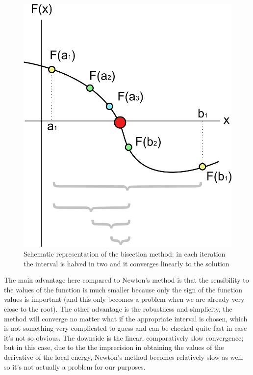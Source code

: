 		\begin{figure}
			\centering \includegraphics[width=0.45\linewidth]{../figures/Bisection_method}
			\protect\caption{Schematic representation of the bisection method: in each iteration the interval is halved in two and it converges linearly to the solution}
		\end{figure}

		The main advantage here compared to Newton's method is that the sensibility to the values of the function is much smaller because only the sign of the function values is important (and this only becomes a problem when we are already very close to the root). The other advantage is the robustness and simplicity, the method will converge no matter what if the appropriate interval is chosen, which is not something very complicated to guess and can be checked quite fast in case it's not so obvious. The downside is the linear, comparatively slow convergence; but in this case, due to the the imprecision in obtaining the values of the derivative of the local energy, Newton's method becomes relatively slow as well, so it's not actually a problem for our purposes.\\
